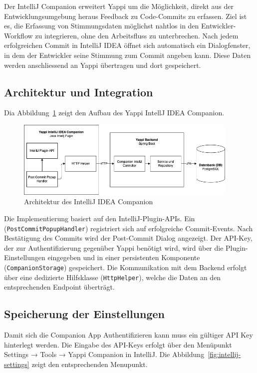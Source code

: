 \documentclass[12pt,a4paper]{report}
\begin{document}
Der IntelliJ Companion erweitert Yappi um die Möglichkeit, direkt aus der Entwicklungsumgebung heraus Feedback zu Code-Commits
zu erfassen. Ziel ist es, die Erfassung von Stimmungsdaten möglichst nahtlos in den Entwickler-Workflow zu integrieren, ohne den
Arbeitsfluss zu unterbrechen. Nach jedem erfolgreichen Commit in IntelliJ IDEA öffnet sich automatisch ein Dialogfenster, in dem
der Entwickler seine Stimmung zum Commit angeben kann. Diese Daten werden anschliessend an Yappi übertragen und dort gespeichert.

\subsection{Architektur und Integration}

Dia Abbildung~\ref{fig:intellij-system-diagram} zeigt den Aufbau des Yappi IntellJ IDEA Companion.

\begin{figure}[H]
\centering
\includegraphics[width=0.95\textwidth]{../figures/intellij-system-diagram.drawio.png}
\caption{Architektur des IntelliJ IDEA Companion}
\label{fig:intellij-system-diagram}
\end{figure}

Die Implementierung basiert auf den IntelliJ-Plugin-APIs. Ein (\texttt{PostCommitPopupHandler}) registriert sich auf erfolgreiche
Commit-Events. Nach Bestätigung des Commits wird der Post-Commit Dialog angezeigt. Der API-Key, der zur Authentifizierung
gegenüber Yappi benötigt wird, wird über die Plugin-Einstellungen eingegeben und in einer persistenten Komponente
(\texttt{CompanionStorage}) gespeichert. Die Kommunikation mit dem Backend erfolgt über eine dedizierte Hilfsklasse
(\texttt{HttpHelper}), welche die Daten an den entsprechenden Endpoint überträgt.

\subsection{Speicherung der Einstellungen}

Damit sich die Companion App Authentifizieren kann muss ein gültiger API Key hinterlegt werden. Die Eingabe des API-Keys erfolgt
über den Menüpunkt Settings → Tools → Yappi Companion in IntelliJ. Die Abbildung~\ref{fig:intellij-settings} zeigt den 
entsprechenden Menupunkt.
\end{document}
